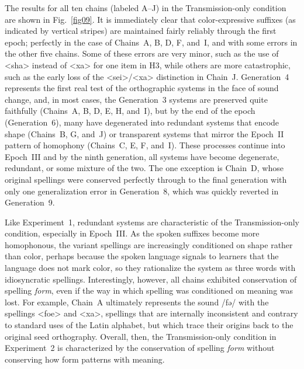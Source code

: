\documentclass[doc,biblatex]{apa7}
\begin{document}
The results for all ten chains (labeled A--J) in the Transmission-only condition are shown in Fig.~\ref{fig09}. It is immediately clear that color-expressive suffixes (as indicated by vertical stripes) are maintained fairly reliably through the first epoch; perfectly in the case of Chains~A, B, D, F, and~I, and with some errors in the other five chains. Some of these errors are very minor, such as the use of <sha> instead of <xa> for one item in H3, while others are more catastrophic, such as the early loss of the <sei>/<xa> distinction in Chain~J. Generation~4 represents the first real test of the orthographic systems in the face of sound change, and, in most cases, the Generation~3 systems are preserved quite faithfully (Chains~A, B, D, E, H, and~I), but by the end of the epoch (Generation~6), many have degenerated into redundant systems that encode shape (Chains~B, G, and~J) or transparent systems that mirror the Epoch~II pattern of homophony (Chains~C, E, F, and~I). These processes continue into Epoch~III and by the ninth generation, all systems have become degenerate, redundant, or some mixture of the two. The one exception is Chain~D, whose original spellings were conserved perfectly through to the final generation with only one generalization error in Generation~8, which was quickly reverted in Generation~9.

Like Experiment~1, redundant systems are characteristic of the Transmission-only condition, especially in Epoch~III. As the spoken suffixes become more homophonous, the variant spellings are increasingly conditioned on shape rather than color, perhaps because the spoken language signals to learners that the language does not mark color, so they rationalize the system as three words with idiosyncratic spellings. Interestingly, however, all chains exhibited conservation of spelling \textit{form}, even if the way in which spelling was conditioned on meaning was lost. For example, Chain~A ultimately represents the sound /fə/ with the spellings <foe> and <xa>, spellings that are internally inconsistent and contrary to standard uses of the Latin alphabet, but which trace their origins back to the original seed orthography. Overall, then, the Transmission-only condition in Experiment~2 is characterized by the conservation of spelling \textit{form} without conserving how form patterns with meaning.
\end{document}
